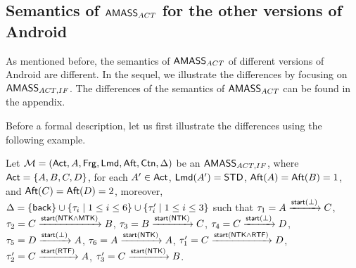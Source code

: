 
\subsection{Semantics of {$\textsf{AMASS}_{ACT}$} for the other versions of Android}

As mentioned before, the semantics of {$\textsf{AMASS}_{ACT}$} of different versions of Android are different. In the sequel, we illustrate the differences by focusing on $\textsf{AMASS}_{ACT,IF}$. The differences of the semantics of {$\textsf{AMASS}_{ACT}$} can be found in the appendix. 

Before a formal description, let us first illustrate the differences using the following example. 
\begin{example}
    Let ${\mathcal{M} } = ({\sf Act},A,{\sf Frg},{\sf Lmd},{\sf Aft},{\sf Ctn}, \Delta)$ be an {$\textsf{AMASS}_{ACT,IF}$}, where ${\sf Act} = \{A,B,C,D\}$, for each $A' \in{\sf Act}$, ${\sf Lmd}(A') = {\sf STD}$, ${\sf Aft}(A) = {\sf Aft}(B) = 1$, and ${\sf Aft}(C) = {\sf Aft}(D) = 2$, moreover, $\Delta = \{{\mathsf{back} }\} \cup  \{\tau_i \mid 1\le i \le 6\} \cup \{\tau'_i \mid 1\le i \le 3\} $ such that 
        $\tau_1 = A\xrightarrow{{\mathsf{start} }(\bot)}C$,
        $\tau_2 = C\xrightarrow{{\mathsf{start} }({\sf NTK}\wedge{\sf MTK})}B$,
        $\tau_3 = B\xrightarrow{{\mathsf{start} }({\sf NTK})}C$,
        $\tau_4 = C\xrightarrow{{\mathsf{start} }(\bot)}D$,
        $\tau_5 = D\xrightarrow{{\mathsf{start} }(\bot)}A$,
        $\tau_6 = A\xrightarrow{{\mathsf{start} }({\sf NTK})}A$,
        $\tau'_1 = C\xrightarrow{{\mathsf{start} }({\sf NTK}\wedge{\sf RTF})}D$,
        $\tau'_2 = C\xrightarrow{{\mathsf{start} }({\sf RTF})}A$,
        $\tau'_3 = C\xrightarrow{{\mathsf{start} }({\sf NTK})}B$.


\end{example}
